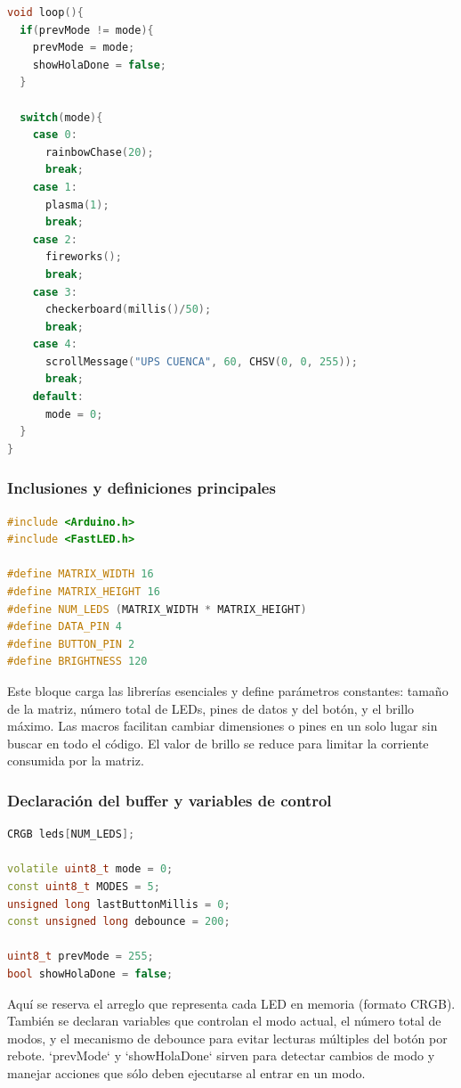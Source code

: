 \documentclass[a4paper,12pt]{article}
\begin{document}
\begin{lstlisting}[language=C++, caption={Código completo para la matriz LED 16x16 con ESP32 y FastLED}]
void loop(){
  if(prevMode != mode){
    prevMode = mode;
    showHolaDone = false;
  }

  switch(mode){
    case 0:
      rainbowChase(20);
      break;
    case 1:
      plasma(1);
      break;
    case 2:
      fireworks();
      break;
    case 3:
      checkerboard(millis()/50);
      break;
    case 4:
      scrollMessage("UPS CUENCA", 60, CHSV(0, 0, 255));
      break;
    default:
      mode = 0;
  }
}
\end{lstlisting}

\subsubsection{Inclusiones y definiciones principales}

\begin{lstlisting}[language=C++, caption={Inclusiones y macros principales}]
#include <Arduino.h>
#include <FastLED.h>

#define MATRIX_WIDTH 16
#define MATRIX_HEIGHT 16
#define NUM_LEDS (MATRIX_WIDTH * MATRIX_HEIGHT)
#define DATA_PIN 4
#define BUTTON_PIN 2
#define BRIGHTNESS 120
\end{lstlisting}

Este bloque carga las librerías esenciales y define parámetros constantes: tamaño de la matriz, número total de LEDs, pines de datos y del botón, y el brillo máximo. Las macros facilitan cambiar dimensiones o pines en un solo lugar sin buscar en todo el código. El valor de brillo se reduce para limitar la corriente consumida por la matriz.

\newpage

\subsubsection{Declaración del buffer y variables de control}

\begin{lstlisting}[language=C++, caption={Buffer de LEDs y variables de control}]
CRGB leds[NUM_LEDS];

volatile uint8_t mode = 0;
const uint8_t MODES = 5;
unsigned long lastButtonMillis = 0;
const unsigned long debounce = 200;

uint8_t prevMode = 255;
bool showHolaDone = false;
\end{lstlisting}

Aquí se reserva el arreglo que representa cada LED en memoria (formato CRGB). También se declaran variables que controlan el modo actual, el número total de modos, y el mecanismo de debounce para evitar lecturas múltiples del botón por rebote. `prevMode` y `showHolaDone` sirven para detectar cambios de modo y manejar acciones que sólo deben ejecutarse al entrar en un modo.
\end{document}
